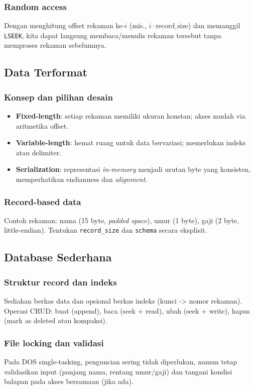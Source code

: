 \subsubsection{Random access}
Dengan menghitung offset rekaman ke-\(i\) (mis., \(i \cdot \text{record\_size}\)) dan memanggil \texttt{LSEEK}, kita dapat langsung membaca/menulis rekaman tersebut tanpa memproses rekaman sebelumnya.

\subsection{Data Terformat}
\subsubsection{Konsep dan pilihan desain}
\begin{itemize}
  \item \textbf{Fixed-length}: setiap rekaman memiliki ukuran konstan; akses mudah via aritmetika offset.
  \item \textbf{Variable-length}: hemat ruang untuk data bervariasi; memerlukan indeks atau delimiter.
  \item \textbf{Serialization}: representasi \textit{in-memory} menjadi urutan byte yang konsisten, memperhatikan endianness dan \textit{alignment}.
\end{itemize}

\subsubsection{Record-based data}
Contoh rekaman: nama (15 byte, \textit{padded space}), umur (1 byte), gaji (2 byte, little-endian). Tentukan \texttt{record\_size} dan \texttt{schema} secara eksplisit.

\subsection{Database Sederhana}
\subsubsection{Struktur record dan indeks}
Sediakan berkas data dan opsional berkas indeks (kunci -> nomor rekaman). Operasi CRUD: buat (append), baca (seek + read), ubah (seek + write), hapus (mark as deleted atau kompaksi).

\subsubsection{File locking dan validasi}
Pada DOS single-tasking, penguncian sering tidak diperlukan, namun tetap validasikan input (panjang nama, rentang umur/gaji) dan tangani kondisi balapan pada akses bersamaan (jika ada).

